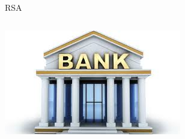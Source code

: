 \documentclass{beamer}
\begin{document}
\begin{frame}{RSA}
	\begin{columns}
		\begin{column}[T]{0.5\textwidth}
			\includegraphics[width=\textwidth]{img/bank.jpg}
		\end{column}
	

\end{columns}
\end{frame}
\end{document}
